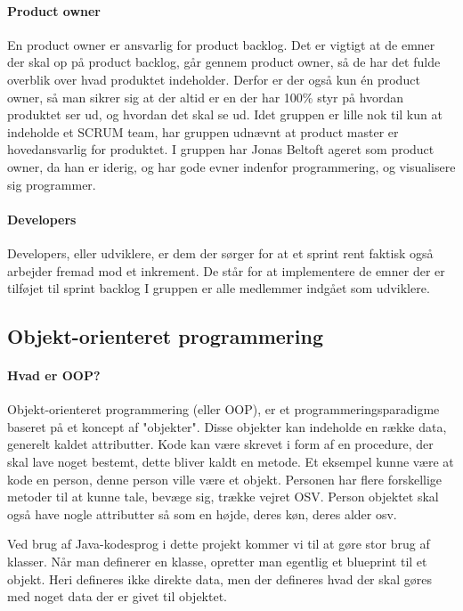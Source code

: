 \paragraph{Product owner}
En product owner er ansvarlig for product backlog. Det er vigtigt at de emner der skal op på product backlog, går gennem product owner, så de har det fulde overblik over hvad produktet indeholder. Derfor er der også kun én product owner, så man sikrer sig at der altid er en der har 100\% styr på hvordan produktet ser ud, og hvordan det skal se ud. Idet gruppen er lille nok til kun at indeholde et SCRUM team, har gruppen udnævnt at product master er hovedansvarlig for produktet. 
I gruppen har Jonas Beltoft ageret som product owner, da han er iderig, og har gode evner indenfor programmering, og visualisere sig programmer.

\paragraph{Developers}
Developers, eller udviklere, er dem der sørger for at et sprint rent faktisk også arbejder fremad mod et inkrement. De står for at implementere de emner der er tilføjet til sprint backlog
I gruppen er alle medlemmer indgået som udviklere.

\subsection{Objekt-orienteret programmering}
\paragraph{Hvad er OOP?}
Objekt-orienteret programmering (eller OOP), er et programmeringsparadigme baseret på et koncept af "objekter". Disse objekter kan indeholde en række data, generelt kaldet attributter. Kode kan være skrevet i form af en procedure, der skal lave noget bestemt, dette bliver kaldt en metode. Et eksempel kunne være at kode en person, denne person ville være et objekt. Personen har flere forskellige metoder til at kunne tale, bevæge sig, trække vejret OSV. Person objektet skal også have nogle attributter så som en højde, deres køn, deres alder osv. 

Ved brug af Java-kodesprog i dette projekt kommer vi til at gøre stor brug af klasser. Når man definerer en klasse, opretter man egentlig et blueprint til et objekt. Heri defineres ikke direkte data, men der defineres hvad der skal gøres med noget data der er givet til objektet.

